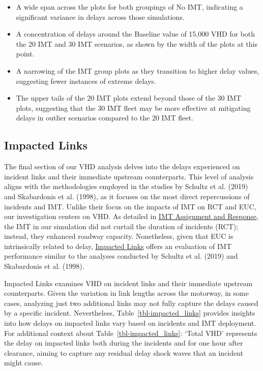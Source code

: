 \documentclass[fancy, oneside, mastersfancy, ms]{byuthesis}
\providecommand{\tightlist}{%
  \setlength{\itemsep}{0pt}\setlength{\parskip}{0pt}}\usepackage{longtable,booktabs,array}
\begin{document}
\begin{itemize}
\tightlist
\item
  A wide span across the plots for both groupings of No IMT, indicating
  a significant variance in delays across those simulations.
\item
  A concentration of delays around the Baseline value of 15,000 VHD for
  both the 20 IMT and 30 IMT scenarios, as shown by the width of the
  plots at this point.
\item
  A narrowing of the IMT group plots as they transition to higher delay
  values, suggesting fewer instances of extreme delays.
\item
  The upper tails of the 20 IMT plots extend beyond those of the 30 IMT
  plots, suggesting that the 30 IMT fleet may be more effective at
  mitigating delays in outlier scenarios compared to the 20 IMT fleet.
\end{itemize}

\hypertarget{sec-impacted}{%
\subsection{Impacted Links}\label{sec-impacted}}

The final section of our VHD analysis delves into the delays experienced
on incident links and their immediate upstream counterparts. This level
of analysis aligns with the methodologies employed in the studies by
Schultz et al. (2019) and Skabardonis et al. (1998), as it focuses on
the most direct repercussions of incidents and IMT. Unlike their focus
on the impacts of IMT on RCT and EUC, our investigation centers on VHD.
As detailed in \protect\hyperlink{sec-imt_response}{IMT Assignment and
Response}, the IMT in our simulation did not curtail the duration of
incidents (RCT); instead, they enhanced roadway capacity. Nonetheless,
given that EUC is intrinsically related to delay,
\protect\hyperlink{sec-impacted}{Impacted Links} offers an evaluation of
IMT performance similar to the analyses conducted by Schultz et al.
(2019) and Skabardonis et al. (1998).

Impacted Links examines VHD on incident links and their immediate
upstream counterparts. Given the variation in link lengths across the
motorway, in some cases, analyzing just two additional links may not
fully capture the delays caused by a specific incident. Nevertheless,
Table~\ref{tbl-impacted_links} provides insights into how delays on
impacted links vary based on incidents and IMT deployment. For
additional context about Table~\ref{tbl-impacted_links}: `Total VHD'
represents the delay on impacted links both during the incidents and for
one hour after clearance, aiming to capture any residual delay shock
waves that an incident might cause.
\end{document}
